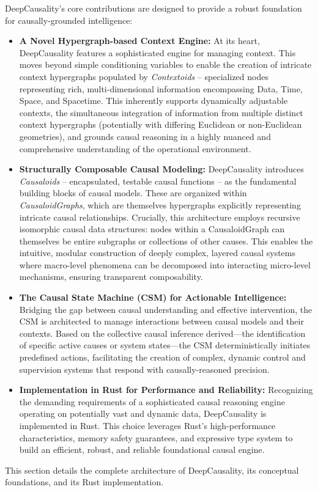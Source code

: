 DeepCausality’s core contributions are designed to provide a robust foundation for causally-grounded intelligence:
\begin{itemize}
    \item \textbf{A Novel Hypergraph-based Context Engine:} At its heart, DeepCausality features a sophisticated engine for managing context. This moves beyond simple conditioning variables to enable the creation of intricate context hypergraphs populated by \textit{Contextoids} – specialized nodes representing rich, multi-dimensional information encompassing Data, Time, Space, and Spacetime. This inherently supports dynamically adjustable contexts, the simultaneous integration of information from multiple distinct context hypergraphs (potentially with differing Euclidean or non-Euclidean geometries), and grounds causal reasoning in a highly nuanced and comprehensive understanding of the operational environment.
    \item \textbf{Structurally Composable Causal Modeling:} DeepCausality introduces \textit{Causaloids} – encapsulated, testable causal functions – as the fundamental building blocks of causal models. These are organized within \textit{CausaloidGraphs}, which are themselves hypergraphs explicitly representing intricate causal relationships. Crucially, this architecture employs recursive isomorphic causal data structures: nodes within a CausaloidGraph can themselves be entire subgraphs or collections of other causes. This enables the intuitive, modular construction of deeply complex, layered causal systems where macro-level phenomena can be decomposed into interacting micro-level mechanisms, ensuring transparent composability.
    \item \textbf{The Causal State Machine (CSM) for Actionable Intelligence:} Bridging the gap between causal understanding and effective intervention, the CSM is architected to manage interactions between causal models and their contexts. Based on the collective causal inference derived—the identification of specific active causes or system states—the CSM deterministically initiates predefined actions, facilitating the creation of complex, dynamic control and supervision systems that respond with causally-reasoned precision.
    \item \textbf{Implementation in Rust for Performance and Reliability:} Recognizing the demanding requirements of a sophisticated causal reasoning engine operating on potentially vast and dynamic data, DeepCausality is implemented in Rust. This choice leverages Rust’s high-performance characteristics, memory safety guarantees, and expressive type system to build an efficient, robust, and reliable foundational causal engine.
    
\end{itemize}

This section details the complete architecture of DeepCausality, its conceptual foundations, and its Rust implementation.

\newpage
